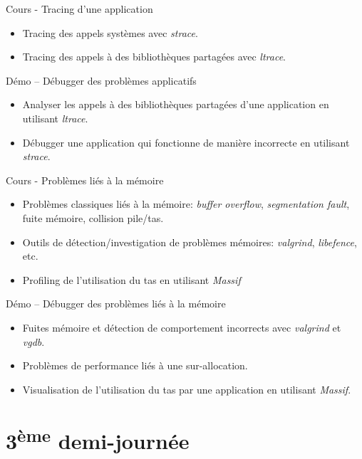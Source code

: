 \documentclass[a4paper,12pt,obeyspaces,spaces,hyphens]{article}
\begin{document}
\feagendatwocolumn
{Cours - Tracing d'une application}
{
  \begin{itemize}
  \item Tracing des appels systèmes avec {\em strace}.
  \item Tracing des appels à des bibliothèques partagées avec {\em ltrace}.
  \end{itemize}
}
{Démo – Débugger des problèmes applicatifs}
{
  \begin{itemize}
  \item Analyser les appels à des bibliothèques partagées d'une
    application en utilisant {\em ltrace}.
  \item Débugger une application qui fonctionne de manière incorrecte
    en utilisant {\em strace}.
  \end{itemize}
}

\feagendatwocolumn
{Cours - Problèmes liés à la mémoire}
{
  \begin{itemize}
  \item Problèmes classiques liés à la mémoire: {\em buffer overflow},
    {\em segmentation fault}, fuite mémoire, collision pile/tas.
  \item Outils de détection/investigation de problèmes mémoires: {\em
      valgrind}, {\em libefence}, etc.
  \item Profiling de l'utilisation du tas en utilisant {\em Massif}
  \end{itemize}
}
{Démo – Débugger des problèmes liés à la mémoire}
{
  \begin{itemize}
  \item Fuites mémoire et détection de comportement incorrects avec
    {\em valgrind} et {\em vgdb}.
  \item Problèmes de performance liés à une sur-allocation.
  \item Visualisation de l'utilisation du tas par une application en
    utilisant {\em Massif}.
  \end{itemize}
}

\section{3\textsuperscript{ème} demi-journée}
\end{document}
